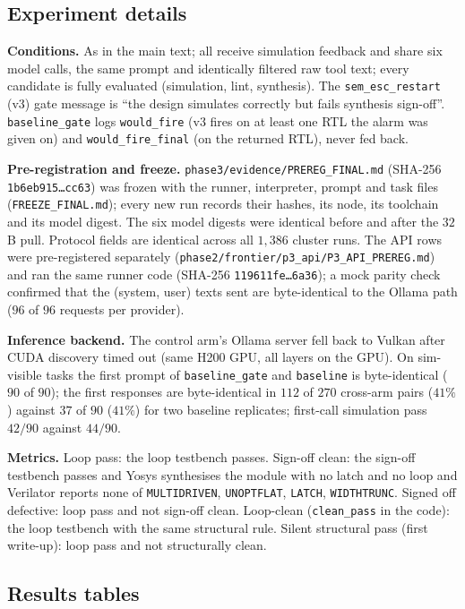 \documentclass[11pt]{article}
\newcommand{\cond}[1]{\texttt{#1}}
\begin{document}
\subsection{Experiment details}

\textbf{Conditions.} As in the main text; all receive simulation feedback and
share six model calls, the same prompt and identically filtered raw tool text;
every candidate is fully evaluated (simulation, lint, synthesis). The
\cond{sem\_esc\_restart} (v3) gate message is ``the design simulates correctly
but fails synthesis sign-off''. \cond{baseline\_gate} logs \texttt{would\_fire}
(v3 fires on at least one RTL the alarm was given on) and
\texttt{would\_fire\_final} (on the returned RTL), never fed back.

\textbf{Pre-registration and freeze.} \texttt{phase3/evidence/PREREG\_FINAL.md}
(SHA-256 \texttt{1b6eb915\ldots cc63}) was frozen with the runner, interpreter,
prompt and task files (\texttt{FREEZE\_FINAL.md}); every new run records their
hashes, its node, its toolchain and its model digest. The six model digests were
identical before and after the $32$B pull. Protocol fields are identical across
all $1{,}386$ cluster runs. The API rows were pre-registered separately
(\texttt{phase2/frontier/p3\_api/P3\_API\_PREREG.md}) and ran the same runner
code (SHA-256 \texttt{119611fe\ldots6a36}); a mock parity check confirmed that
the (system, user) texts sent are byte-identical to the Ollama path ($96$ of
$96$ requests per provider).

\textbf{Inference backend.} The control arm's Ollama server fell back to Vulkan
after CUDA discovery timed out (same H200 GPU, all layers on the GPU). On
sim-visible tasks the first prompt of \cond{baseline\_gate} and \cond{baseline}
is byte-identical ($90$ of $90$); the first responses are byte-identical in
$112$ of $270$ cross-arm pairs ($41\%$) against $37$ of $90$ ($41\%$) for two
baseline replicates; first-call simulation pass $42/90$ against $44/90$.

\textbf{Metrics.} Loop pass: the loop testbench passes. Sign-off clean: the
sign-off testbench passes and Yosys synthesises the module with no latch and no
loop and Verilator reports none of \cond{MULTIDRIVEN}, \cond{UNOPTFLAT},
\cond{LATCH}, \cond{WIDTHTRUNC}. Signed off defective: loop pass and not sign-off
clean. Loop-clean (\texttt{clean\_pass} in the code): the loop testbench with the
same structural rule. Silent structural pass (first write-up): loop pass and not
structurally clean.

\subsection{Results tables}
\end{document}
